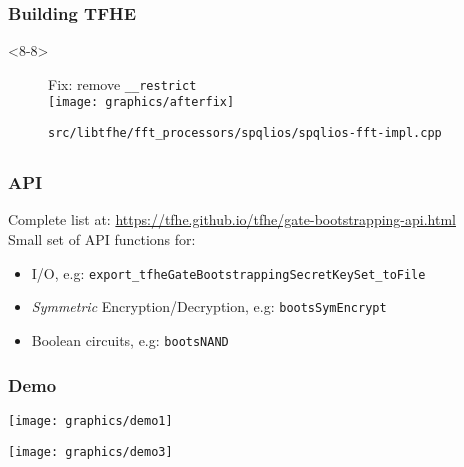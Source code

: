 \documentclass[lualatex, 9pt,serif]{beamer}
\newenvironment{cframe}[1]{
\begin{frame}
\frametitle{#1} } 
{
\end{frame}
}
\begin{document}
\begin{cframe}{Building TFHE}
	\begin{onlyenv}<8-8>
		\begin{figure}
			Fix: remove \texttt{\_\_restrict} \\
			\vspace{0.2cm}
			\texttt{[image: graphics/afterfix]}
			\caption*{\texttt{src/libtfhe/fft\_processors/spqlios/spqlios-fft-impl.cpp}}
		\end{figure}
	\end{onlyenv}

\end{cframe}	
\subsection[API]{}
\begin{cframe}{API}
	Complete list at: \textcolor{blue}{\url{https://tfhe.github.io/tfhe/gate-bootstrapping-api.html}} \\[1cm]
	Small set of API functions for:
	\begin{itemize}
		\item<2-> I/O, e.g: \texttt{export\_tfheGateBootstrappingSecretKeySet\_toFile}
		\item<3-> \textit{Symmetric} Encryption/Decryption, e.g: \texttt{bootsSymEncrypt} 
		\item<4-> Boolean circuits, e.g: \texttt{bootsNAND}
	\end{itemize}
	\vspace{1cm}
\end{cframe}

\begin{cframe}{Demo}
	\begin{minipage}{0.45\textwidth}
		\hspace*{-1cm}\texttt{[image: graphics/demo1]}
	\end{minipage}
	\begin{minipage}{0.45\textwidth}
		\texttt{[image: graphics/demo3]}
	\end{minipage}
\end{cframe}
\end{document}
